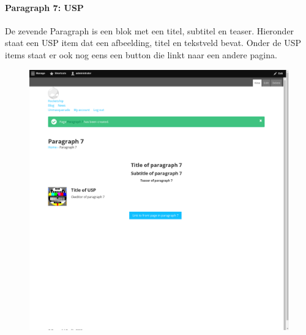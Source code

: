 \paragraph{Paragraph 7: USP}
De zevende Paragraph is een blok met een titel, subtitel en teaser. Hieronder staat een USP item dat een afbeelding, titel en tekstveld bevat. Onder de USP items staat er ook nog eens een button die linkt naar een andere pagina.
\begin{figure}[h]
\includegraphics[width=1\textwidth]{img/p007.png}
\end{figure}

\clearpage
